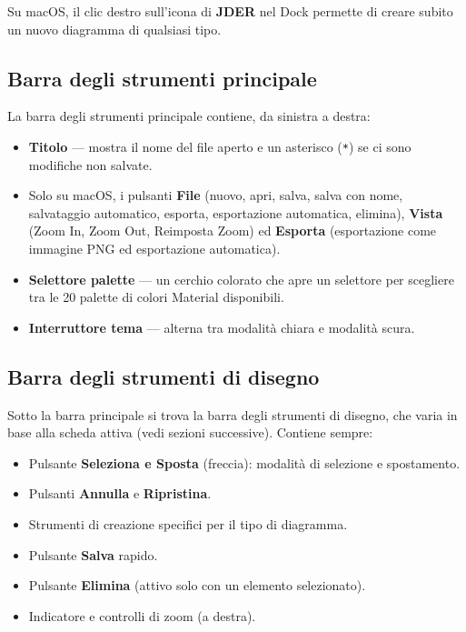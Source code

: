\documentclass[a4paper,11pt]{article}
\newcommand{\uielement}[1]{\textbf{#1}}
\newcommand{\jder}{\textbf{JDER}}
\begin{document}
Su macOS, il clic destro sull'icona di \jder{} nel Dock permette di creare subito un nuovo
diagramma di qualsiasi tipo.

\subsection{Barra degli strumenti principale}

La barra degli strumenti principale contiene, da sinistra a destra:

\begin{itemize}
  \item \textbf{Titolo} --- mostra il nome del file aperto e un asterisco (\texttt{*}) se ci sono
        modifiche non salvate.
  \item Solo su macOS, i pulsanti \uielement{File} (nuovo, apri, salva, salva con nome,
        salvataggio automatico, esporta, esportazione automatica, elimina), \uielement{Vista}
        (Zoom In, Zoom Out, Reimposta Zoom) ed \uielement{Esporta} (esportazione come immagine
        PNG ed esportazione automatica).
  \item \textbf{Selettore palette} --- un cerchio colorato che apre un selettore per scegliere
        tra le 20 palette di colori Material disponibili.
  \item \textbf{Interruttore tema} --- alterna tra modalità chiara e modalità scura.
\end{itemize}

\subsection{Barra degli strumenti di disegno}

Sotto la barra principale si trova la barra degli strumenti di disegno, che varia in base alla
scheda attiva (vedi sezioni successive). Contiene sempre:

\begin{itemize}
  \item Pulsante \uielement{Seleziona e Sposta} (freccia): modalità di selezione e spostamento.
  \item Pulsanti \uielement{Annulla} e \uielement{Ripristina}.
  \item Strumenti di creazione specifici per il tipo di diagramma.
  \item Pulsante \uielement{Salva} rapido.
  \item Pulsante \uielement{Elimina} (attivo solo con un elemento selezionato).
  \item Indicatore e controlli di zoom (a destra).
\end{itemize}
\end{document}
